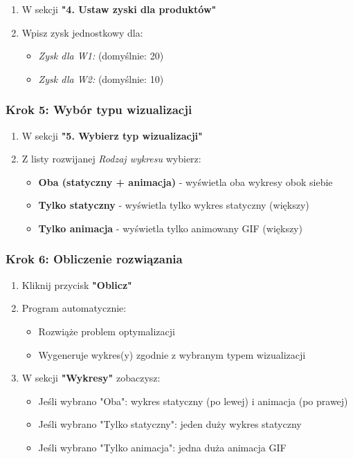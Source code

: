 \documentclass[12pt,a4paper]{article}
\begin{document}
\begin{enumerate}
    \item W sekcji \textbf{"4. Ustaw zyski dla produktów"}
    \item Wpisz zysk jednostkowy dla:
    \begin{itemize}
        \item \textit{Zysk dla W1:} (domyślnie: 20)
        \item \textit{Zysk dla W2:} (domyślnie: 10)
    \end{itemize}
\end{enumerate}

\subsubsection{Krok 5: Wybór typu wizualizacji}

\begin{enumerate}
    \item W sekcji \textbf{"5. Wybierz typ wizualizacji"}
    \item Z listy rozwijanej \textit{Rodzaj wykresu} wybierz:
    \begin{itemize}
        \item \textbf{Oba (statyczny + animacja)} - wyświetla oba wykresy obok siebie
        \item \textbf{Tylko statyczny} - wyświetla tylko wykres statyczny (większy)
        \item \textbf{Tylko animacja} - wyświetla tylko animowany GIF (większy)
    \end{itemize}
\end{enumerate}

\subsubsection{Krok 6: Obliczenie rozwiązania}

\begin{enumerate}
    \item Kliknij przycisk \textbf{"Oblicz"}
    \item Program automatycznie:
    \begin{itemize}
        \item Rozwiąże problem optymalizacji
        \item Wygeneruje wykres(y) zgodnie z wybranym typem wizualizacji
    \end{itemize}
    \item W sekcji \textbf{"Wykresy"} zobaczysz:
    \begin{itemize}
        \item Jeśli wybrano "Oba": wykres statyczny (po lewej) i animacja (po prawej)
        \item Jeśli wybrano "Tylko statyczny": jeden duży wykres statyczny
        \item Jeśli wybrano "Tylko animacja": jedna duża animacja GIF
    \end{itemize}
\end{enumerate}
\end{document}
